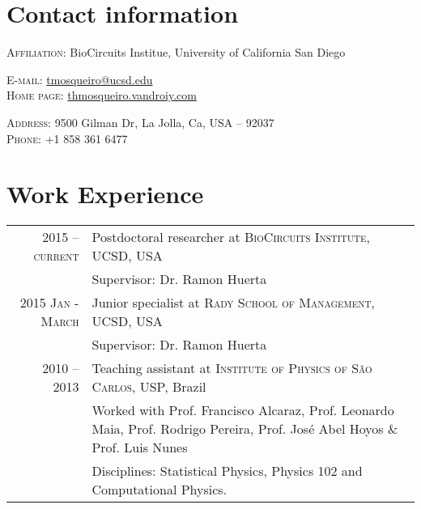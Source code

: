 \documentclass[letter,10pt]{article} %
\renewcommand{\emph}{\textbf}
\begin{document}
\pagestyle{fancy}
\fancyhead{}
\fancyfoot{}
\fancyfoot[RO,LE] {\thepage}
\renewcommand{\headrulewidth}{0.pt}

\par{\bigskip\par}

\section{Contact information}

\textsc{Affiliation:} BioCircuits Institue, University of California San Diego

\begin{minipage}{0.4\textwidth}
  \textsc{E-mail:} \href{mailto:tmosqueiro@ucsd.edu}{tmosqueiro@ucsd.edu} \\
  \textsc{Home page:} \href{http://thmosqueiro.vandroiy.com}{thmosqueiro.vandroiy.com}
\end{minipage}
\begin{minipage}{0.5\textwidth}
  \textsc{Address:} 9500 Gilman Dr, La Jolla, Ca, USA -- 92037 \\
  \textsc{Phone:} +1 858 361 6477
\end{minipage}


\section{Work Experience}

\begin{tabular}{r|p{11cm}}
  \setlength{\itemsep}{5cm}

  \textsc{2015 -- current} & Postdoctoral researcher at \textsc{BioCircuits Institute}, UCSD, USA \emph{}\\
  & \footnotesize{Supervisor: Dr. Ramon Huerta}

  \vspace{0.2cm}
  \\
  \textsc{2015 Jan - March} & Junior specialist at \textsc{Rady School of Management}, UCSD, USA \emph{}\\
  & \footnotesize{Supervisor: Dr. Ramon Huerta}

  \vspace{0.2cm}
  \\
  \textsc{2010 -- 2013} & Teaching assistant at \textsc{Institute of Physics of S\~ao Carlos}, USP, Brazil\\
  & \footnotesize{Worked with Prof. Francisco Alcaraz, Prof. Leonardo Maia, Prof. Rodrigo Pereira, Prof. Jos\'e Abel Hoyos \& Prof. Luis Nunes}\\
  & \footnotesize{Disciplines: Statistical Physics, Physics 102 and Computational Physics.}

\end{tabular}
\end{document}
